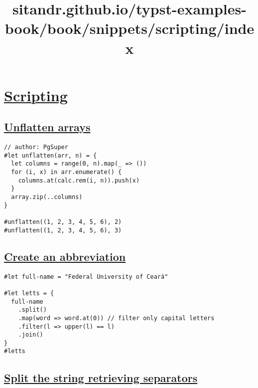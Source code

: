 \title{sitandr.github.io/typst-examples-book/book/snippets/scripting/index}

\section{\texorpdfstring{\hyperref[scripting]{Scripting}}{Scripting}}\label{scripting}

\subsection{\texorpdfstring{\hyperref[unflatten-arrays]{Unflatten
arrays}}{Unflatten arrays}}\label{unflatten-arrays}

\begin{verbatim}
// author: PgSuper
#let unflatten(arr, n) = {
  let columns = range(0, n).map(_ => ())
  for (i, x) in arr.enumerate() {
    columns.at(calc.rem(i, n)).push(x)
  }
  array.zip(..columns)
}

#unflatten((1, 2, 3, 4, 5, 6), 2)
#unflatten((1, 2, 3, 4, 5, 6), 3)
\end{verbatim}

\pandocbounded{}

\subsection{\texorpdfstring{\hyperref[create-an-abbreviation]{Create an
abbreviation}}{Create an abbreviation}}\label{create-an-abbreviation}

\begin{verbatim}
#let full-name = "Federal University of Ceará"

#let letts = {
  full-name
    .split()
    .map(word => word.at(0)) // filter only capital letters
    .filter(l => upper(l) == l)
    .join()
}
#letts
\end{verbatim}

\pandocbounded{}

\subsection{\texorpdfstring{\hyperref[split-the-string-retrieving-separators]{Split
the string retrieving
separators}}{Split the string retrieving separators}}\label{split-the-string-retrieving-separators}

